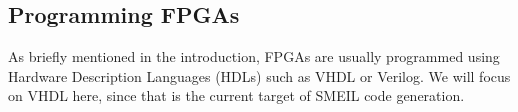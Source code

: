 \subsection{Programming FPGAs}
As briefly mentioned in the introduction, FPGAs are usually programmed using
Hardware Description Languages (HDLs) such as VHDL or Verilog. We will focus on
VHDL here, since that is the current target of SMEIL code generation.

